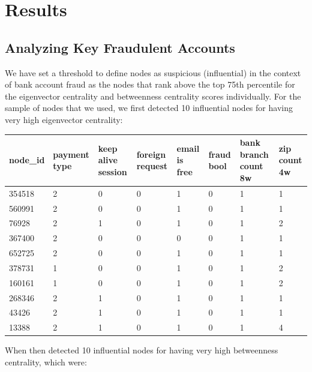\documentclass{styles/svproc}
\begin{document}
\bigskip
\section{Results}

\subsection{Analyzing Key Fraudulent Accounts}

We have set a threshold to define nodes as suspicious (influential) in the context of bank account fraud as the nodes that rank above the top 75th percentile for the eigenvector centrality and betweenness centrality scores individually. For the sample of nodes that we used, we first detected 10 influential nodes for having very high eigenvector centrality:

\noindent
\begin{tabular}{ | m{2cm} | m{1.5cm}| m{1.2cm}| m{1.2cm}| m{1.2cm}| m{1.1cm}| m{1.2cm}| m{1.1cm}|} 
  \hline
  \textbf{node\_id} & \textbf{payment type} & \textbf{keep alive session} & \textbf{foreign request} &  \textbf{email is free} & \textbf{fraud bool} & \textbf{bank branch count 8w} & \textbf{zip count 4w}\\ 
  \hline
   354518 & 2 & 0 & 0 & 1 & 0 & 1 & 1\\ 
  \hline
  560991 & 2 & 0 & 0 & 1 & 0 & 1 & 1\\ 
  \hline
  76928 & 2 & 1 & 0 & 1 & 0 & 1 & 2\\
  \hline
  367400 & 2 & 0 & 0 & 0 & 0 & 1 & 1\\
  \hline
  652725 & 2 & 0 & 0 & 1 & 0 & 1 & 1\\
  \hline
  378731 & 1 & 0 & 0 & 1 & 0 & 1 & 2\\
  \hline
  160161 & 1 & 0 & 0 & 1 & 0 & 1 & 2\\
  \hline
  268346 & 2 & 1 & 0 & 1 & 0 & 1 & 1\\
  \hline
  43426 & 2 & 1 & 0 & 1 & 0 & 1 & 1\\
  \hline
  13388 & 2 & 1 & 0 & 1 & 0 & 1 & 4\\
  \hline
\end{tabular}


\noindent When then detected 10 influential nodes for having very high betweenness centrality, which were:
\end{document}
